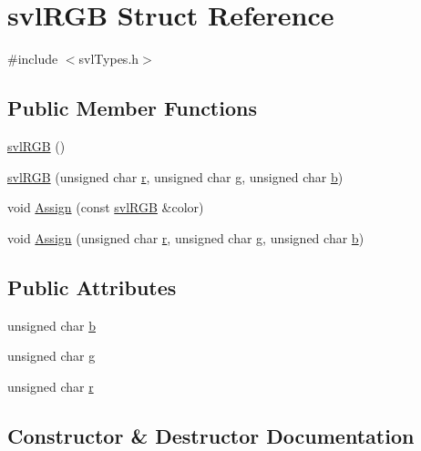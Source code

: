 \hypertarget{structsvl_r_g_b}{}\section{svl\+R\+G\+B Struct Reference}
\label{structsvl_r_g_b}


{\ttfamily \#include $<$svl\+Types.\+h$>$}

\subsection*{Public Member Functions}
\begin{DoxyCompactItemize}
\item 
\hyperlink{structsvl_r_g_b_a532c9ac3487c554f172524a56f2e96cc}{svl\+R\+G\+B} ()
\item 
\hyperlink{structsvl_r_g_b_a0f422c113dddebfa69270ac93f07a7d5}{svl\+R\+G\+B} (unsigned char \hyperlink{structsvl_r_g_b_a823fa06835ecc0bbcdc9b121a13631da}{r}, unsigned char \hyperlink{structsvl_r_g_b_aad56aeef6a029768848b46ea91b7332c}{g}, unsigned char \hyperlink{structsvl_r_g_b_ab426f773070147f8a3bced446636662d}{b})
\item 
void \hyperlink{structsvl_r_g_b_a21f5a70015d23823a658ea49e590b40d}{Assign} (const \hyperlink{structsvl_r_g_b}{svl\+R\+G\+B} \&color)
\item 
void \hyperlink{structsvl_r_g_b_a297344a5cd767c5d23a54b4105c8c193}{Assign} (unsigned char \hyperlink{structsvl_r_g_b_a823fa06835ecc0bbcdc9b121a13631da}{r}, unsigned char \hyperlink{structsvl_r_g_b_aad56aeef6a029768848b46ea91b7332c}{g}, unsigned char \hyperlink{structsvl_r_g_b_ab426f773070147f8a3bced446636662d}{b})
\end{DoxyCompactItemize}
\subsection*{Public Attributes}
\begin{DoxyCompactItemize}
\item 
unsigned char \hyperlink{structsvl_r_g_b_ab426f773070147f8a3bced446636662d}{b}
\item 
unsigned char \hyperlink{structsvl_r_g_b_aad56aeef6a029768848b46ea91b7332c}{g}
\item 
unsigned char \hyperlink{structsvl_r_g_b_a823fa06835ecc0bbcdc9b121a13631da}{r}
\end{DoxyCompactItemize}


\subsection{Constructor \& Destructor Documentation}
\hypertarget{structsvl_r_g_b_a532c9ac3487c554f172524a56f2e96cc}{}
